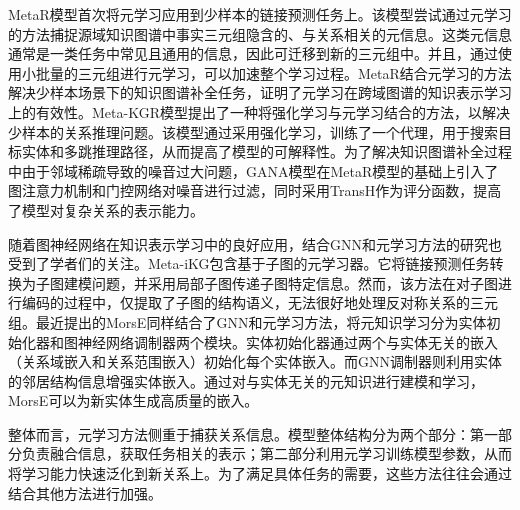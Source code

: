 MetaR\cite{chen2019meta}模型首次将元学习应用到少样本的链接预测任务上。该模型尝试通过元学习的方法捕捉源域知识图谱中事实三元组隐含的、与关系相关的元信息。这类元信息通常是一类任务中常见且通用的信息，因此可迁移到新的三元组中。并且，通过使用小批量的三元组进行元学习，可以加速整个学习过程。MetaR结合元学习的方法解决少样本场景下的知识图谱补全任务，证明了元学习在跨域图谱的知识表示学习上的有效性。Meta-KGR\cite{lv2019adapting}模型提出了一种将强化学习与元学习结合的方法，以解决少样本的关系推理问题。该模型通过采用强化学习，训练了一个代理，用于搜索目标实体和多跳推理路径，从而提高了模型的可解释性。为了解决知识图谱补全过程中由于邻域稀疏导致的噪音过大问题，GANA\cite{niu2021relational}模型在MetaR模型的基础上引入了图注意力机制和门控网络对噪音进行过滤，同时采用TransH作为评分函数，提高了模型对复杂关系的表示能力。

随着图神经网络在知识表示学习中的良好应用，结合GNN和元学习方法的研究也受到了学者们的关注。Meta-iKG\cite{zheng2022subgraph}包含基于子图的元学习器。它将链接预测任务转换为子图建模问题，并采用局部子图传递子图特定信息。然而，该方法在对子图进行编码的过程中，仅提取了子图的结构语义，无法很好地处理反对称关系的三元组。最近提出的MorsE\cite{chen2022meta}同样结合了GNN和元学习方法，将元知识学习分为实体初始化器和图神经网络调制器两个模块。实体初始化器通过两个与实体无关的嵌入（关系域嵌入和关系范围嵌入）初始化每个实体嵌入。而GNN调制器则利用实体的邻居结构信息增强实体嵌入。通过对与实体无关的元知识进行建模和学习，MorsE可以为新实体生成高质量的嵌入。

整体而言，元学习方法侧重于捕获关系信息。模型整体结构分为两个部分：第一部分负责融合信息，获取任务相关的表示；第二部分利用元学习训练模型参数，从而将学习能力快速泛化到新关系上。为了满足具体任务的需要，这些方法往往会通过结合其他方法进行加强。


